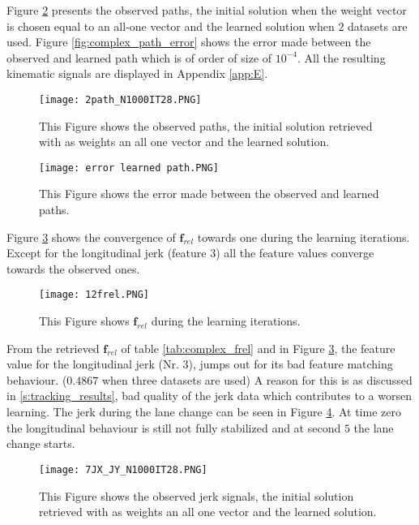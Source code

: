 Figure \ref{fig:complex_path} presents the observed paths, the initial solution when the weight vector is chosen equal to an all-one vector and the learned solution when $2$ datasets are used. Figure \ref{fig:complex_path_error} shows the error made between the observed and learned path which is of order of size of $10^{-4}$. All the resulting kinematic signals are displayed in Appendix \ref{app:E}.

\begin{figure}[h!]
	\centering
	\texttt{[image: 2path\_N1000IT28.PNG]}
	\caption{This Figure shows the observed paths, the initial solution retrieved with as weights an all one vector and the learned solution.}	
	\label{fig:complex_path}
\end{figure}

\begin{figure}[h!]
	\centering
	\texttt{[image: error learned path.PNG]}
	\caption{This Figure shows the error made between the observed and learned paths.}	
	\label{fig:complex_path}
\end{figure}

Figure \ref{fig:complex_convergence} shows the convergence of $\bm{f}_{rel}$ towards one during the learning iterations. Except for the longitudinal jerk (feature $3$) all the feature values converge towards the observed ones.

\begin{figure}[h!]
	\centering
	\texttt{[image: 12frel.PNG]}
	\caption{This Figure shows $\bm{f}_{rel}$ during the learning iterations.}	
	\label{fig:complex_convergence}
\end{figure}

From the retrieved $\bm{f}_{rel}$ of table \ref{tab:complex_frel} and in Figure \ref{fig:complex_convergence}, the feature value for the longitudinal jerk (Nr. $3$), jumps out for its bad feature matching behaviour. ($0.4867$ when three datasets are used) A reason for this is as discussed in \ref{s:tracking_results}, bad quality of the jerk data which contributes to a worsen learning. The jerk during the lane change can be seen in Figure \ref{fig:complex_jerk}. At time zero the longitudinal behaviour is still not fully stabilized and at second $5$ the lane change starts.

\begin{figure}[h!]
	\centering
	\texttt{[image: 7JX\_JY\_N1000IT28.PNG]}
	\caption{This Figure shows the observed jerk signals, the initial solution retrieved with as weights an all one vector and the learned solution.}	
	\label{fig:complex_jerk}
\end{figure}
 \newpage                                
